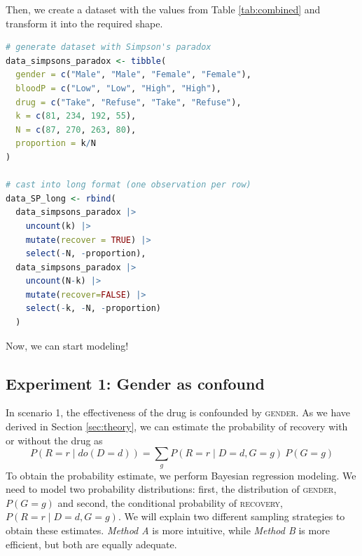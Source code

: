 \documentclass[nobib]{tufte-handout}
\newcommand{\mathdo}{\mathit{do}}
\begin{document}
\vspace{-0.5cm}
Then, we create a dataset with the values from Table \ref{tab:combined} and transform it into the required shape.

\begin{minipage}[]{\textwidth}
\begin{lstlisting}[language=R]
# generate dataset with Simpson's paradox
data_simpsons_paradox <- tibble(
  gender = c("Male", "Male", "Female", "Female"),
  bloodP = c("Low", "Low", "High", "High"),
  drug = c("Take", "Refuse", "Take", "Refuse"),
  k = c(81, 234, 192, 55),
  N = c(87, 270, 263, 80),
  proportion = k/N
)

# cast into long format (one observation per row)
data_SP_long <- rbind(
  data_simpsons_paradox |> 
    uncount(k) |>
    mutate(recover = TRUE) |>
    select(-N, -proportion), 
  data_simpsons_paradox |>
    uncount(N-k) |>
    mutate(recover=FALSE) |>
    select(-k, -N, -proportion)
  )

\end{lstlisting}
\end{minipage}

\vspace{-0.5cm}
Now, we can start modeling!

\subsection{Experiment 1: Gender as confound}

In scenario 1, the effectiveness of the drug is confounded by \textsc{gender}.
As we have derived in Section \ref{sec:theory}, we can estimate the probability of recovery with or without the drug as 
$$P \left(R=r \mid \mathdo (D=d)\right) = \sum_{g} P\left(R = r \mid D=d, G=g \right) \ P\left( G=g \right)$$
To obtain the probability estimate, we perform Bayesian regression modeling.
We need to model two probability distributions: first, the distribution of \textsc{gender}, $P\left( G=g \right)$ and second, the conditional probability of \textsc{recovery}, $P\left(R = r \mid D=d, G=g \right)$.
We will explain two different sampling strategies to obtain these estimates.
\emph{Method A} is more intuitive, while \emph{Method B} is more efficient, but both are equally adequate.
\end{document}
